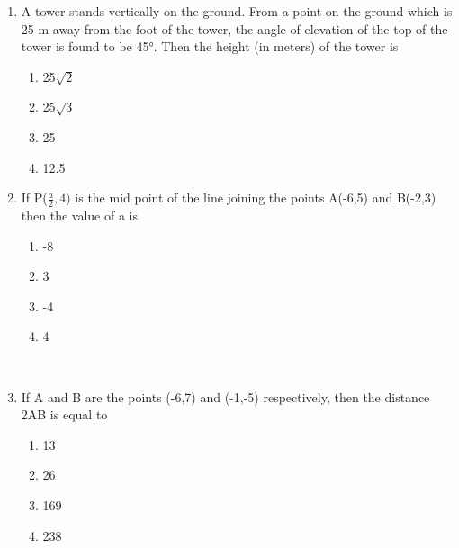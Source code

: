 \documentclass[journal,12pt,twocolumn]{IEEEtran}
\renewcommand\thesection{\arabic{section}}
\begin{document}
\begin{enumerate}[label=\thesection.\arabic*.,ref=\thesection.\theenumi]
\item A tower stands vertically on the ground. From a point on the ground which is 25 m away from the foot of the tower, the angle of elevation of the top of the tower is found to be 45°. Then the height (in meters) of the tower is
\begin{enumerate}
    \item 25$\sqrt{2}$\\
    \item 25$\sqrt{3}$ \\
    \item 25 \\
    \item 12.5
\end{enumerate}
\item If P($\frac{a}{2},4)$ is the mid point of the line joining the points A(-6,5) and B(-2,3) then the value of a is
\begin{enumerate}
    \item -8
    \item 3
    \item -4
    \item 4
\end{enumerate}
%
%
\\
\item If A and B are the points (-6,7) and (-1,-5) respectively, then the distance 2AB is equal to
\begin{enumerate}
    \item 13
    \item 26
    \item 169
    \item 238
\end{enumerate}


\end{enumerate}
\end{document}
